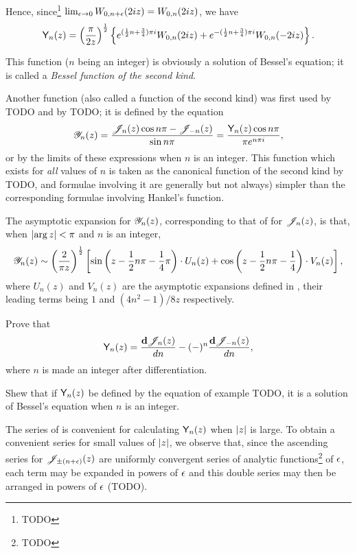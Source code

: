 Hence, since\footnote{TODO}
$\lim_{\epsilon\rightarrow 0} W_{0,n+\epsilon}(2iz) = W_{0,n}(2iz)$, we
have
$$
\mathsf{Y}_{n}(z)
=
\left(  \frac{\pi}{2z}  \right)^{\frac{1}{2}}
\left\{ 
  e^{(\frac{1}{2} n + \frac{3}{4}) \pi i} W_{0,n}(2iz)
  +
  e^{-(\frac{1}{2} n + \frac{3}{4})\pi i} W_{0,n}(-2iz)
 \right\}.
$$

This function ($n$ being an integer) is obviously a solution of
Bessel's equation; it is called a \emph{Bessel function of the
  second kind}.

Another function (also called a function of the second kind) was
first used by TODO and by TODO; it is defined by the equation
$$
\mathscr{Y}_{n}(z) = \frac{\mathscr{J}_{n}(z) \cos n\pi - \mathscr{J}_{-n}(z)}{\sin n\pi}
= \frac{\mathsf{Y}_{n}(z) \cos n\pi}{\pi e^{n\pi i}},
$$
%
%
or by the limits of these expressions when $n$ is an integer. This
function which exists for \emph{all} values of $n$ is taken as the
canonical function of the second kind by TODO, and formulae
involving it are generally but not always) simpler than the
corresponding formulae involving Hankel's function.

The asymptotic expansion for $\mathscr{Y}_{n}(z)$, corresponding to that of
 for $\mathscr{J}_{n}(z)$, is that, when
$\left| \arg z \right| < \pi$ and $n$ is an integer,
$$
\mathscr{Y}_{n}(z)
\sim
\left(  \frac{2}{\pi z}  \right)^{\frac{1}{2}}
\left[  \sin\left( z - \frac{1}{2} n \pi - \frac{1}{4} \pi \right)
  \cdot U_{n}(z)
  + \cos\left( z - \frac{1}{2} n \pi - \frac{1}{4} \right) \cdot V_{n}(z)
 \right],
$$
where $U_{n}(z)$ and $V_{n}(z)$ are the asymptotic expansions defined
in , their leading terms being $1$ and
$(4n^{2}-1)/8z$ respectively.
\begin{wandwexample}
  Prove that
  $$
  \mathsf{Y}_{n}(z)
  =
  \frac{\mathbf{d}\mathscr{J}_{n}(z)}{dn}
  -
  (-)^{n} \frac{\mathbf{d}\mathscr{J}_{-n}(z)}{dn},
  $$
  where $n$ is made an integer after differentiation.
\end{wandwexample}
\begin{wandwexample}
  Shew that if $\mathsf{Y}_{n}(z)$ be defined by the equation of example
  TODO, it is a solution of Bessel's equation when $n$ is an integer.
\end{wandwexample}
The series of  is convenient for calculating
$\mathsf{Y}_{n}(z)$ when $\left| z \right|$ is large. To obtain a convenient
series for small values of $\left| z \right|$, we observe that, since
the ascending series for $\mathscr{J}_{\pm (n+\epsilon)}(z)$ are uniformly
convergent series of analytic functions\footnote{TODO} of $\epsilon$,
each term may be expanded in powers of $\epsilon$ and this double
series may then be arranged in powers of
$\epsilon$ (TODO).

